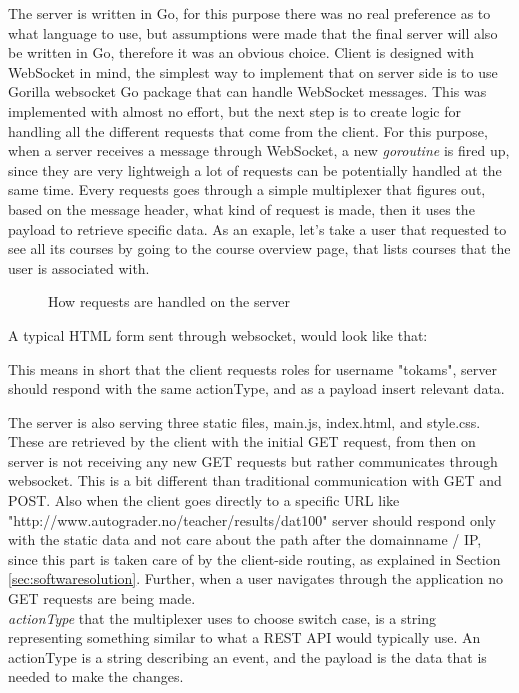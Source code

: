 The server is written in Go, for this purpose there was no real  preference as to what language to use, but assumptions were made that the final server will also be written in Go, therefore it was an obvious choice. Client is designed with WebSocket in mind, the simplest way to implement that on server side is to use Gorilla websocket Go package that can handle WebSocket messages. This was implemented with almost no effort, but the next step is to create logic for handling all the different requests that come from the client. For this purpose, when a server receives a message through WebSocket, a new \emph{goroutine} is fired up, since they are very lightweigh a lot of requests can be potentially handled at the same time. Every requests goes through a simple multiplexer that figures out, based on the message header, what kind of request is made, then it uses the payload to retrieve specific data. As an exaple, let's take a user that requested to see all its courses by going to the course overview page, that lists courses that the user is associated with.

\begin{figure}[h]
  
  \caption{How requests are handled on the server}
  \label{fig:serverwebsocket}
\end{figure}

A typical HTML form sent through websocket, would look like that:

This means in short that the client requests roles for username "tokams", server should respond with the same actionType, and as a payload insert relevant data.

The server is also serving three static files, main.js, index.html, and style.css. These are retrieved by the client with the initial GET request, from then on server is not receiving any new GET requests but rather communicates through websocket. This is a bit different than traditional communication with GET and POST. Also when the client goes directly to a specific URL like "http://www.autograder.no/teacher/results/dat100" server should respond only with the static data and not care about the path after the domainname / IP, since this part is taken care of by the client-side routing, as explained in Section \ref{sec:softwaresolution}. Further, when a user navigates through the application no GET requests are being made.
\\\emph{actionType} that the multiplexer uses to choose switch case, is a string representing something similar to what a REST API would typically use. An actionType is a string describing an event, and the payload is the data that is needed to make the changes.
\newpage
